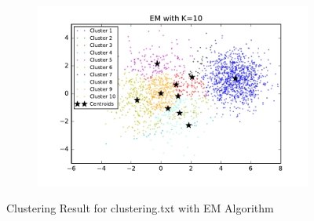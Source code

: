 \begin{description}
\begin{description}
\begin{figure}[!h]
\begin{subfigure}[b]{0.475\textwidth}
        \end{subfigure}
        \hfill
        \begin{subfigure}[b]{0.475\textwidth}   
            \centering 
            \includegraphics[width=\textwidth]{./figures/clustering_EM_10.pdf}
        \end{subfigure}
        
        \caption{Clustering Result for clustering.txt with EM Algorithm}
        \label{fig:EM_clustering}
\end{figure}


\end{description}
\end{description}
